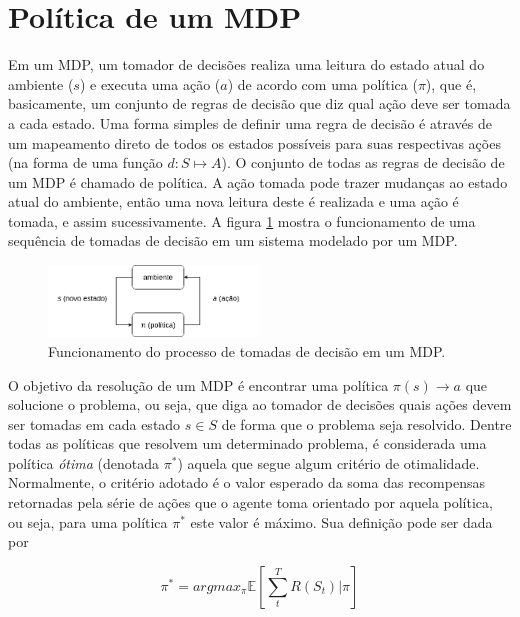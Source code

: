 \documentclass[cic,tc]{iiufrgs}
\begin{document}
\section{Política de um MDP}
\label{policy}
Em um MDP, um tomador de decisões realiza uma leitura do estado atual do
ambiente ($s$) e executa uma ação ($a$) de acordo com uma política ($\pi$), que
é, basicamente, um conjunto de regras de decisão que diz qual ação deve ser
tomada a cada estado. Uma forma simples de definir uma regra de decisão é
através de um mapeamento direto de todos os estados possíveis para suas
respectivas ações (na forma de uma função $d: S \mapsto A$). O conjunto de todas
as regras de decisão de um MDP é chamado de política. A ação tomada pode trazer
mudanças ao estado atual do ambiente, então uma nova leitura deste é realizada
e uma ação é tomada, e assim sucessivamente. A figura \ref{fig:fluxo_politica}
mostra o funcionamento de uma sequência de tomadas de decisão em um sistema
modelado por um MDP.

\begin{figure}[h]
    \caption{Funcionamento do processo de tomadas de decisão em um MDP.}
    \begin{center}
      \includegraphics[width=0.5\textwidth]{fluxo_politica.png}
    \end{center}
    \label{fig:fluxo_politica}
\end{figure}

O objetivo da resolução de um MDP é encontrar uma política $\pi(s) \rightarrow a$
que solucione o problema, ou seja, que diga ao tomador de decisões quais ações
devem ser tomadas em cada estado $s \in S$ de forma que o problema seja
resolvido. Dentre todas as políticas que resolvem um determinado problema, é
considerada uma política \textit{ótima} (denotada $\pi^*$) aquela que segue
algum critério de otimalidade. Normalmente, o critério adotado é o valor
esperado da soma das recompensas retornadas pela série de ações que o agente
toma orientado por aquela política, ou seja, para uma política $\pi^*$ este
valor é máximo. Sua definição pode ser dada por


\begin{equation}
  \pi^* = argmax_\pi\mathbb{E}[\sum_t^TR(S_t) | \pi]
\end{equation}
\end{document}
